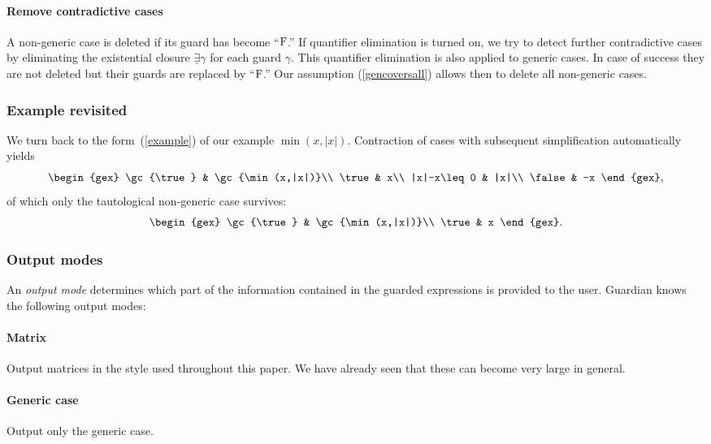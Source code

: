 \paragraph{Remove contradictive cases} A non-generic case is  deleted if
its guard has become ``$\textrm{F}$.'' If quantifier elimination is turned
on, we try to detect further contradictive cases by eliminating the
existential closure $\underline\exists\gamma$ for each guard $\gamma$.
This quantifier elimination is also applied to generic cases. In case
of success they are not deleted but their guards are replaced by
``$\textrm{F}$.'' Our assumption (\ref{gencoversall}) allows then to
delete all non-generic cases.

\subsubsection{Example revisited}
We turn back to the form~(\ref{example}) of our example $\min(x,|x|)$.
Contraction of cases with subsequent simplification automatically
yields
\[
\begin{gex}
\gc{\true} & \gc{\min(x,|x|)}\\
\true & x\\
|x|-x\leq 0 & |x|\\
\false & -x
\end{gex},
\]
of which only the tautological non-generic case survives:
\begin{equation}
\begin{gex}
\gc{\true} & \gc{\min(x,|x|)}\\
\true & x
\end{gex}.\label{minabs}
\end{equation}

\subsubsection{Output modes}
An {\em output mode} determines which part of the information
contained in the guarded expressions is provided to the user. {\sc
Guardian} knows the following output modes:

\paragraph{Matrix} Output matrices in the style used throughout this
paper. We have already seen that these can become very large in
general.
\paragraph{Generic case} Output only the generic case.
